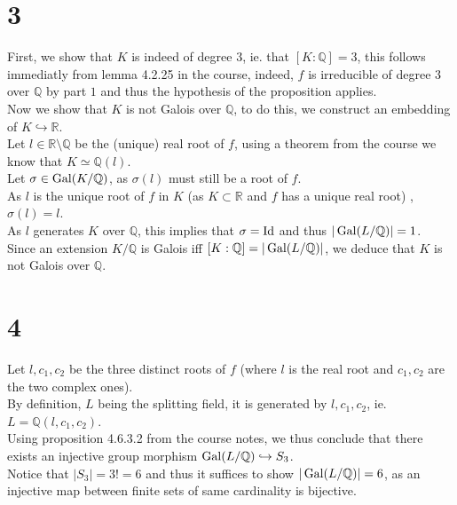 \documentclass[11pt, a4paper]{article}
\begin{document}
\section*{3}
First, we show that $K$ is indeed of degree $3$, ie. that  $ [ K: \mathbb{Q}] = 3$, this follows immediatly from lemma 4.2.25 in the course, indeed, $f$ is irreducible of degree 3 over $ \mathbb{Q}$ by part $1$ and thus the hypothesis of the proposition applies.\\

Now we show that $K$ is not Galois over $ \mathbb{Q}$, to do this, we construct an embedding of $ K \hookrightarrow \mathbb{R}$.\\
Let $l\in \mathbb{R}\setminus \mathbb{Q}$ be the (unique) real root of $f$, using a theorem from the course we know that $ K \simeq \mathbb{Q}(l)$.\\
Let $\sigma \in \operatorname{Gal}(  K / \mathbb{Q}) $, as $\sigma( l) $ must still be a root of $f$.\\
As $l$ is the unique root of $f$ in $K$ (as  $ K \subset \mathbb{R}$ and $f$ has a unique real root) , $\sigma( l) =l$.\\
As $l$ generates $K$ over $ \mathbb{Q}$, this implies that $\sigma= \operatorname{Id}$ and thus $| \operatorname{Gal}( L / \mathbb{Q}) | = 1$.\\
Since an extension $ K / \mathbb{Q}$ is Galois iff $ [  K : \mathbb{Q}] = | \operatorname{Gal}(  L / \mathbb{Q}) |$, we deduce that $K$ is not Galois over $ \mathbb{Q}$.
\section*{4}
Let $l, c_1,c_2$ be the three distinct roots of $f$ (where $l$ is the real root and $c_1,c_2$ are the two complex ones).\\
By definition, $L$ being the splitting field, it is generated by $ l, c_1,c_2$, ie. $L = \mathbb{Q}(l, c_1,c_2) $.\\
Using proposition 4.6.3.2 from the course notes, we thus conclude that there exists an injective group morphism $\operatorname{Gal}( L / \mathbb{Q}) \hookrightarrow S_3$.\\
Notice that $|S_3|=3! = 6$ and thus it suffices to show $ |\operatorname{Gal}( L / \mathbb{Q}) | = 6$, as an injective map between finite sets of same cardinality is bijective.\\
\end{document}
